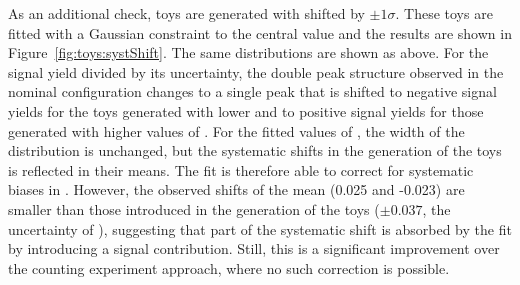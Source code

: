 As an additional check, toys are generated with \Rsfof shifted by $\pm1\sigma$. These toys are fitted with a Gaussian constraint to the central value and the results are shown in Figure~\ref{fig:toys:systShift}. The same distributions are shown as above. For the signal yield divided by its uncertainty, the double peak structure observed in the nominal configuration changes to a single peak that is shifted to negative signal yields for the toys generated with lower and to positive signal yields for those generated with higher values of \Rsfof. For the fitted values of \Rsfof, the width of the distribution is unchanged, but the systematic shifts in the generation of the toys is reflected in their means. The fit is therefore able to correct for systematic biases in \Rsfof. However, the observed shifts of the mean (0.025 and -0.023) are smaller than those introduced in the generation of the toys ($\pm0.037$, the uncertainty of \Rsfof), suggesting that part of the systematic shift is absorbed by the fit by introducing a signal contribution. Still, this is a significant improvement over the counting experiment approach, where no such correction is possible.  
